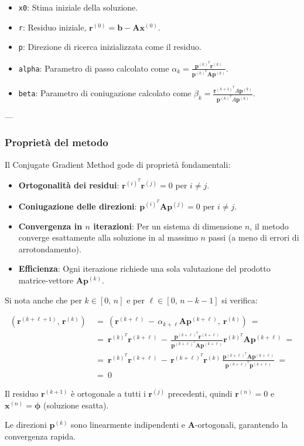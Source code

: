 \begin{itemize}
	\item \texttt{x0}: Stima iniziale della soluzione.
	\item \texttt{r}: Residuo iniziale, $\mathbf{r}^{(0)} = \mathbf{b} - \mathbf{A} \mathbf{x}^{(0)}$.
	\item \texttt{p}: Direzione di ricerca inizializzata come il residuo.
	\item \texttt{alpha}: Parametro di passo calcolato come $\alpha_k = \frac{\mathbf{p}^{(k)^T} \mathbf{r}^{(k)}}{\mathbf{p}^{(k)^T} \mathbf{A} \mathbf{p}^{(k)}}$.
	\item \texttt{beta}: Parametro di coniugazione calcolato come $\beta_k = \frac{\mathbf{r}^{(k+1)^T} A\mathbf{p}^{(k)} }{ \mathbf{p}^{(k)^T} A\mathbf{p}^{(k)}}$.
\end{itemize}

---

\subsubsection{Proprietà del metodo}
Il Conjugate Gradient Method gode di proprietà fondamentali:
\begin{itemize}
	\item \textbf{Ortogonalità dei residui}: $\mathbf{r}^{(i)^T} \mathbf{r}^{(j)} = 0$ per $i \neq j$.
	\item \textbf{Coniugazione delle direzioni}: $\mathbf{p}^{(i)^T} \mathbf{A} \mathbf{p}^{(j)} = 0$ per $i \neq j$.
	\item \textbf{Convergenza in $n$ iterazioni}: Per un sistema di dimensione $n$, il metodo converge esattamente alla soluzione in al massimo $n$ passi (a meno di errori di arrotondamento).
	\item \textbf{Efficienza}: Ogni iterazione richiede una sola valutazione del prodotto matrice-vettore $\mathbf{A} \mathbf{p}^{(k)}$.
\end{itemize}

Si nota anche che per $k\in [0,\, n]$ e per $\ell\in [0,\, n-k-1]$ si verifica:

\[
\begin{aligned}
	(\mathbf r^{(k+\ell+1)},\, \mathbf r^{(k)})\ &=\ (\mathbf r^{(k+\ell)}\, -\, \alpha_{k+\ell}\mathbf A \mathbf p^{(k+\ell)}, \ \mathbf r^{(k)})\ =\\
	&=\ \mathbf r^{(k)^T} \mathbf r^{(k+\ell)}\, -\, \frac{\mathbf p^{(k+\ell)^T} \mathbf r^{(k+\ell)}}{\mathbf p^{(k+\ell)^T} \mathbf A \mathbf p^{(k+\ell)}} \mathbf r^{(k)^T} \mathbf A \mathbf p^{(k+\ell)}\ =\\
	& =\ \mathbf r^{(k)^T} \mathbf r^{(k+\ell)}\, -\, 
	\mathbf r^{(k+\ell)^T} \mathbf r^{(k)}\,
	\frac{\mathbf p^{(k+\ell)^T} \mathbf A \mathbf p^{(k+\ell)}}{\mathbf p^{(k+\ell)^T} \mathbf p^{(k+\ell)}} \ =\\
	& =\ 0
\end{aligned}
\]

Il residuo $\mathbf{r}^{(k+1)}$ è ortogonale a tutti i $\mathbf{r}^{(j)}$ precedenti, quindi $\mathbf{r}^{(n)} = 0$ e $\mathbf{x}^{(n)} = \mathbf{\phi}$ (soluzione esatta).

Le direzioni $\mathbf{p}^{(k)}$ sono linearmente indipendenti e $\mathbf{A}$-ortogonali, garantendo la convergenza rapida.


